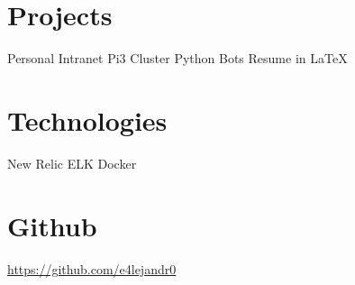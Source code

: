 \documentclass[]{friggeri-cv}
\begin{document}
\begin{aside}
  \section{Projects}
    \bullet\hspace{0.2cm}Personal Intranet
    \bullet\hspace{0.2cm}Pi3 Cluster
    \bullet\hspace{0.2cm}Python Bots
    \bullet\hspace{0.2cm}Resume in LaTeX
    ~
  \section{Technologies}
    \bullet\hspace{0.2cm}New Relic
    \bullet\hspace{0.2cm}ELK
    \bullet\hspace{0.2cm}Docker
    ~
  \section{Github}
    \href{https://github.com/e4lejandr0}{https://github.com/e4lejandr0}
    ~
\end{aside}
\end{document}
